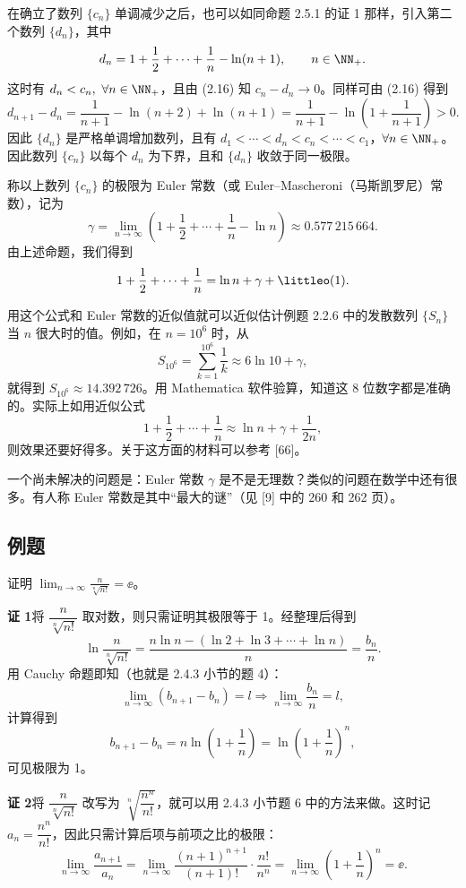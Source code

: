 \begin{xremark}
在确立了数列 $\{c_n\}$ 单调减少之后，也可以如同命题 2.5.1 的证 1 那样，引入第二个数列 $\{d_n\}$，其中
\[
  d_n=1+\frac12+\cdots+\frac1n-\ln(n+1),\qquad n\in\NN_+.
\]
这时有 $d_n<c_n,\ \forall n\in\NN_+$，且由 (2.16) 知 $c_n-d_n\to0$。同样可由 (2.16) 得到
\[
  d_{n+1}-d_n=\frac1{n+1}-\ln(n+2)+\ln(n+1)
  =\frac1{n+1}-\ln\left(1+\frac1{n+1}\right)>0.
\]
因此 $\{d_n\}$ 是严格单调增加数列，且有 $d_1<\cdots<d_n<c_n<\cdots<c_1$，$\forall n\in\NN_+$。因此数列 $\{c_n\}$ 以每个 $d_n$ 为下界，且和 $\{d_n\}$ 收敛于同一极限。
\end{xremark}

称以上数列 $\{c_n\}$ 的极限为 Euler 常数（或 Euler--Mascheroni（马斯凯罗尼）常数），记为
\[
  \gamma=\lim_{n\to\infty}\left(1+\frac12+\cdots+\frac1n-\ln n\right)
  \approx0.577\,215\,664.
\]
由上述命题，我们得到
\[
  1+\frac12+\cdots+\frac1n=\ln n+\gamma+\littleo(1).
\]

用这个公式和 Euler 常数的近似值就可以近似估计例题 2.2.6 中的发散数列 $\{S_n\}$ 当 $n$ 很大时的值。例如，在 $n=10^6$ 时，从
\[
  S_{10^6}=\sum_{k=1}^{10^6}\frac1k\approx6\ln10+\gamma,
\]
就得到 $S_{10^6}\approx14.392\,726$。用 Mathematica 软件验算，知道这 8 位数字都是准确的。实际上如用近似公式
\[
  1+\frac12+\cdots+\frac1n\approx\ln n+\gamma+\frac1{2n},
\]
则效果还要好得多。关于这方面的材料可以参考 [66]。

一个尚未解决的问题是：Euler 常数 $\gamma$ 是不是无理数？类似的问题在数学中还有很多。有人称 Euler 常数是其中“最大的谜”（见 [9] 中的 260 和 262 页）。

\subsection{例题}

\begin{xexample}[2.5.3]
证明 $\displaystyle\lim_{n\to\infty}\frac n{\sqrt[n]{n!}}=\ee$。
\end{xexample}
\begin{xproof}
\textbf{证 1}\quad 将 $\dfrac n{\sqrt[n]{n!}}$ 取对数，则只需证明其极限等于 1。经整理后得到
\[
  \ln\frac n{\sqrt[n]{n!}}
  =\frac{n\ln n-(\ln2+\ln3+\cdots+\ln n)}n
  =\frac{b_n}{n}.
\]
用 Cauchy 命题即知（也就是 2.4.3 小节的题 4）：
\[
  \lim_{n\to\infty}(b_{n+1}-b_n)=l
  \Longrightarrow
  \lim_{n\to\infty}\frac{b_n}{n}=l,
\]
计算得到
\[
  b_{n+1}-b_n=n\ln\left(1+\frac1n\right)
  =\ln\left(1+\frac1n\right)^n,
\]
可见极限为 1。

\textbf{证 2}\quad 将 $\dfrac n{\sqrt[n]{n!}}$ 改写为 $\sqrt[n]{\dfrac{n^n}{n!}}$，就可以用 2.4.3 小节题 6 中的方法来做。这时记 $a_n=\dfrac{n^n}{n!}$，因此只需计算后项与前项之比的极限：
\[
  \lim_{n\to\infty}\frac{a_{n+1}}{a_n}
  =\lim_{n\to\infty}\frac{(n+1)^{n+1}}{(n+1)!}\cdot\frac{n!}{n^n}
  =\lim_{n\to\infty}\left(1+\frac1n\right)^n=\ee.
\]
\end{xproof}

